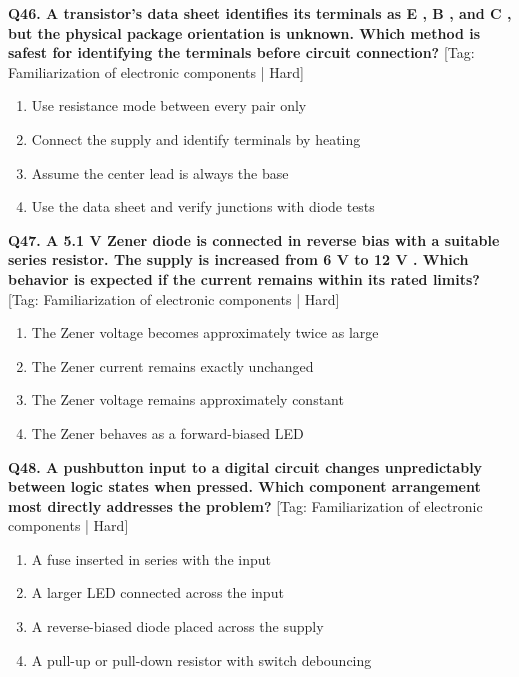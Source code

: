 \noindent\textbf{Q46. A transistor's data sheet identifies its terminals as E , B , and C , but the physical package orientation is unknown. Which method is safest for identifying the terminals before circuit connection?} \hfill [Tag: Familiarization of electronic components | Hard]
\begin{enumerate}[label=(\alph*),topsep=2pt,itemsep=1pt,partopsep=0pt,parsep=0pt]
    \item {Use resistance mode between every pair only}
    \item {Connect the supply and identify terminals by heating}
    \item {Assume the center lead is always the base}
    \item {Use the data sheet and verify junctions with diode tests}
\end{enumerate}
\vspace{2mm}

\noindent\textbf{Q47. A 5.1 V Zener diode is connected in reverse bias with a suitable series resistor. The supply is increased from 6 V to 12 V . Which behavior is expected if the current remains within its rated limits?} \hfill [Tag: Familiarization of electronic components | Hard]
\begin{enumerate}[label=(\alph*),topsep=2pt,itemsep=1pt,partopsep=0pt,parsep=0pt]
    \item {The Zener voltage becomes approximately twice as large}
    \item {The Zener current remains exactly unchanged}
    \item {The Zener voltage remains approximately constant}
    \item {The Zener behaves as a forward-biased LED}
\end{enumerate}
\vspace{2mm}

\noindent\textbf{Q48. A pushbutton input to a digital circuit changes unpredictably between logic states when pressed. Which component arrangement most directly addresses the problem?} \hfill [Tag: Familiarization of electronic components | Hard]
\begin{enumerate}[label=(\alph*),topsep=2pt,itemsep=1pt,partopsep=0pt,parsep=0pt]
    \item {A fuse inserted in series with the input}
    \item {A larger LED connected across the input}
    \item {A reverse-biased diode placed across the supply}
    \item {A pull-up or pull-down resistor with switch debouncing}
\end{enumerate}
\vspace{2mm}

